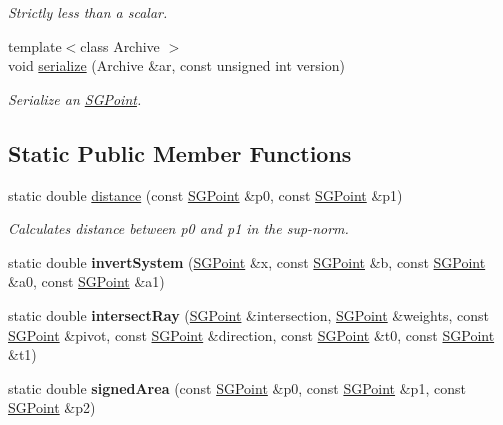 \begin{DoxyCompactItemize}
\begin{DoxyCompactList}\small\item\em Strictly less than a scalar. \end{DoxyCompactList}\item 
\hypertarget{class_s_g_point_a1fbc1552f839d84bbcac667c768e9726}{{\footnotesize template$<$class Archive $>$ }\\void \hyperlink{class_s_g_point_a1fbc1552f839d84bbcac667c768e9726}{serialize} (Archive \&ar, const unsigned int version)}\label{class_s_g_point_a1fbc1552f839d84bbcac667c768e9726}

\begin{DoxyCompactList}\small\item\em Serialize an \hyperlink{class_s_g_point}{S\+G\+Point}. \end{DoxyCompactList}\end{DoxyCompactItemize}
\subsection*{Static Public Member Functions}
\begin{DoxyCompactItemize}
\item 
\hypertarget{class_s_g_point_a48385eb046cb530f7a7af6a147b6218c}{static double \hyperlink{class_s_g_point_a48385eb046cb530f7a7af6a147b6218c}{distance} (const \hyperlink{class_s_g_point}{S\+G\+Point} \&p0, const \hyperlink{class_s_g_point}{S\+G\+Point} \&p1)}\label{class_s_g_point_a48385eb046cb530f7a7af6a147b6218c}

\begin{DoxyCompactList}\small\item\em Calculates distance between p0 and p1 in the sup-\/norm. \end{DoxyCompactList}\item 
\hypertarget{class_s_g_point_a0a613c9498f11a7d2d50c4f7f371dab9}{static double {\bfseries invert\+System} (\hyperlink{class_s_g_point}{S\+G\+Point} \&x, const \hyperlink{class_s_g_point}{S\+G\+Point} \&b, const \hyperlink{class_s_g_point}{S\+G\+Point} \&a0, const \hyperlink{class_s_g_point}{S\+G\+Point} \&a1)}\label{class_s_g_point_a0a613c9498f11a7d2d50c4f7f371dab9}

\item 
\hypertarget{class_s_g_point_a81992734a4de046226d60b3df576bbb6}{static double {\bfseries intersect\+Ray} (\hyperlink{class_s_g_point}{S\+G\+Point} \&intersection, \hyperlink{class_s_g_point}{S\+G\+Point} \&weights, const \hyperlink{class_s_g_point}{S\+G\+Point} \&pivot, const \hyperlink{class_s_g_point}{S\+G\+Point} \&direction, const \hyperlink{class_s_g_point}{S\+G\+Point} \&t0, const \hyperlink{class_s_g_point}{S\+G\+Point} \&t1)}\label{class_s_g_point_a81992734a4de046226d60b3df576bbb6}

\item 
\hypertarget{class_s_g_point_a24a3cc80a532ee6b5c85713b69153311}{static double {\bfseries signed\+Area} (const \hyperlink{class_s_g_point}{S\+G\+Point} \&p0, const \hyperlink{class_s_g_point}{S\+G\+Point} \&p1, const \hyperlink{class_s_g_point}{S\+G\+Point} \&p2)}\label{class_s_g_point_a24a3cc80a532ee6b5c85713b69153311}

\end{DoxyCompactItemize}
